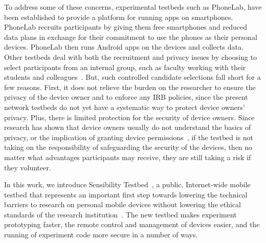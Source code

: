 To address some of these concerns, experimental testbeds such as
PhoneLab, have
been established to provide a platform for running apps on
smartphones. PhoneLab recruits participants by giving them free
smartphones and reduced data plans in exchange for their commitment to
use the phones as their personal devices. PhoneLab then runs Android
apps on the devices and collects data. Other testbeds deal with both
the recruitment and privacy issues by choosing to select participants
from an internal group, such as faculty working with their students
and colleagues~\cite{hao2013isleep, wang2012no, wang2013sensing}. But,
such controlled candidate selections fall short for a few reasons.
First, it does not relieve the burden on the researcher to ensure the privacy of the
device owner and to enforce any IRB policies, since the present
network testbeds do not yet have a systematic way to protect device
owners' privacy. Plus,
there is limited protection for the security of device owners. Since
research has shown that device owners usually do not understand the
basics of privacy, or the implication of granting device
permissions~\cite{camp2015respecting}, if the testbed is not taking on
the responsibility of safeguarding the security of the devices, then
no matter what advantages participants may receive, they are still
taking a risk if they volunteer.

In this work, we introduce Sensibility Testbed~\cite{sensibility,
zhuang2015privacy}, a public,
Internet-wide mobile testbed that represents an important first step
towards lowering the technical barriers to research on personal mobile
devices without lowering the
ethical standards of the research
institution~\cite{zevenbergen2013ethical}.
The new testbed makes experiment prototyping faster, the remote
control and management of devices easier, and the running of
experiment code more secure in a number of ways.

